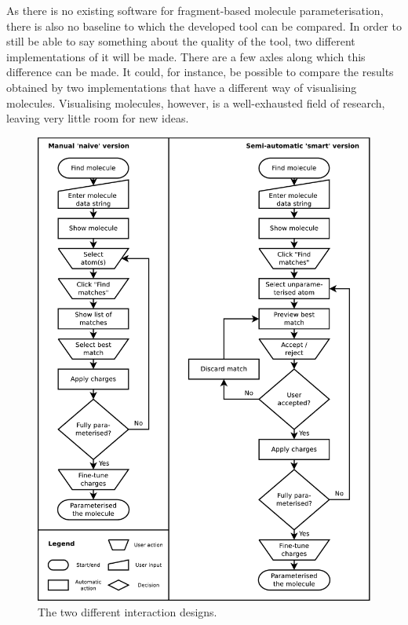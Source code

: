As there is no existing software for fragment-based molecule parameterisation, there is also no baseline to which the developed tool can be compared. In order to still be able to say something about the quality of the tool, two different implementations of it will be made. There are a few axles along which this difference can be made. It could, for instance, be possible to compare the results obtained by two implementations that have a different way of visualising molecules. Visualising molecules, however, is a well-exhausted field of research, leaving very little room for new ideas.

\begin{figure}[h!]
\begin{center}
\includegraphics[width=.9\textwidth]{img/complete_id.pdf}
\caption{The two different interaction designs.}
\end{center}
\end{figure}


